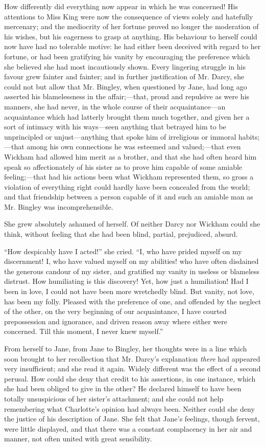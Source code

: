 How differently did everything now appear in which he was concerned! His attentions to Miss King were now the consequence of views solely and hatefully mercenary; and the mediocrity of her fortune proved no longer the moderation of his wishes, but his eagerness to grasp at anything. His behaviour to herself could now have had no tolerable motive: he had either been deceived with regard to her fortune, or had been gratifying his vanity by encouraging the preference which she believed she had most incautiously shown. Every lingering struggle in his favour grew fainter and fainter; and in further justification of Mr. Darcy, she could not but allow that Mr. Bingley, when questioned by Jane, had long ago asserted his blamelessness in the affair;---that, proud and repulsive as were his manners, she had never, in the whole course of their acquaintance---an acquaintance which had latterly brought them much together, and given her a sort of intimacy with his ways---seen anything that betrayed him to be unprincipled or unjust---anything that spoke him of irreligious or immoral habits;---that among his own connections he was esteemed and valued;---that even Wickham had allowed him merit as a brother, and that she had often heard him speak so affectionately of his sister as to prove him capable of some amiable feeling;---that had his actions been what Wickham represented them, so gross a violation of everything right could hardly have been concealed from the world; and that friendship between a person capable of it and such an amiable man as Mr. Bingley was incomprehensible.

She grew absolutely ashamed of herself. Of neither Darcy nor Wickham could she think, without feeling that she had been blind, partial, prejudiced, absurd.

``How despicably have I acted!'' she cried. ``I, who have prided myself on my discernment! I, who have valued myself on my abilities! who have often disdained the generous candour of my sister, and gratified my vanity in useless or blameless distrust. How humiliating is this discovery! Yet, how just a humiliation! Had I been in love, I could not have been more wretchedly blind. But vanity, not love, has been my folly. Pleased with the preference of one, and offended by the neglect of the other, on the very beginning of our acquaintance, I have courted prepossession and ignorance, and driven reason away where either were concerned. Till this moment, I never knew myself.''

From herself to Jane, from Jane to Bingley, her thoughts were in a line which soon brought to her recollection that Mr. Darcy's explanation \textit{there} had appeared very insufficient; and she read it again. Widely different was the effect of a second perusal. How could she deny that credit to his assertions, in one instance, which she had been obliged to give in the other? He declared himself to have been totally unsuspicious of her sister's attachment; and she could not help remembering what Charlotte's opinion had always been. Neither could she deny the justice of his description of Jane. She felt that Jane's feelings, though fervent, were little displayed, and that there was a constant complacency in her air and manner, not often united with great sensibility.

